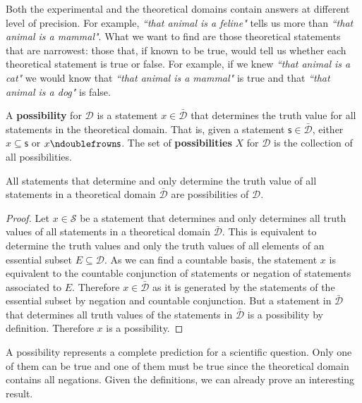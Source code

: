 \documentclass[11pt,letterpaper,fleqn]{memoir} %
\begin{document}
Both the experimental and the theoretical domains contain answers at different level of precision. For example, \emph{``that animal is a feline"} tells us more than \emph{``that animal is a mammal"}. What we want to find are those theoretical statements that are narrowest: those that, if known to be true, would tell us whether each theoretical statement is true or false. For example, if we knew \emph{``that animal is a cat"} we would know that \emph{``that animal is a mammal"} is true and that \emph{``that animal is a dog"} is false.

\begin{mathSection}

\begin{defn}
	A \textbf{possibility} for $\mathcal{D}$ is a statement $x \in \bar{\mathcal{D}}$ that determines the truth value for all statements in the theoretical domain. That is, given a statement $\mathsf{s} \in \bar{\mathcal{D}}$, either $x \subseteq \mathsf{s}$ or $x \ncomp \mathsf{s}$. The set of \textbf{possibilities} $X$ for $\mathcal{D}$ is the collection of all possibilities.
\end{defn}

\begin{prop}
	All statements that determine and only determine the truth value of all statements in a theoretical domain $\bar{\mathcal{D}}$ are possibilities of $\mathcal{D}$.
\end{prop}

\begin{proof}
	Let $x \in \mathcal{S}$ be a statement that determines and only determines all truth values of all statements in a theoretical domain $\bar{\mathcal{D}}$. This is equivalent to determine the truth values and only the truth values of all elements of an essential subset $E \subseteq \mathcal{D}$. As we can find a countable basis, the statement $x$ is equivalent to the countable conjunction of statements or negation of statements associated to $E$. Therefore $x \in \bar{\mathcal{D}}$ as it is generated by the statements of the essential subset by negation and countable conjunction. But a statement in $\bar{\mathcal{D}}$ that determines all truth values of the statements in $\bar{\mathcal{D}}$ is a possibility by definition. Therefore $x$ is a possibility.
\end{proof}
\end{mathSection}

A possibility represents a complete prediction for a scientific question. Only one of them can be true and one of them must be true since the theoretical domain contains all negations. Given the definitions, we can already prove an interesting result.
\end{document}

